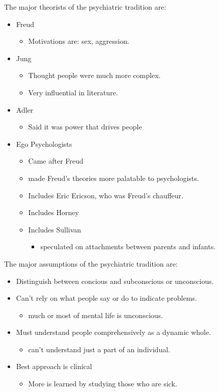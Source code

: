 \documentclass[12pt]{article}
\begin{document}
The major theorists of the psychiatric tradition are:
\begin{itemize}
    \item Freud
        \begin{itemize}
            \item Motivations are: sex, aggression.
        \end{itemize}
    \item Jung
        \begin{itemize}
            \item Thought people were much more complex.
            \item Very influential in literature.
        \end{itemize}
    \item Adler
        \begin{itemize}
            \item Said it was power that drives people
        \end{itemize}
    \item Ego Psychologists
        \begin{itemize}
            \item Came after Freud
            \item made Freud's theories more palatable to psychologists.
            \item Includes Eric Ericson, who was Freud's chauffeur.
            \item Includes Horney
            \item Includes Sullivan
                \begin{itemize}
                    \item speculated on attachments between parents and infants.
                \end{itemize}
        \end{itemize}
\end{itemize}

The major assumptions of the psychiatric tradition are:
\begin{itemize}
    \item Distinguish between concious and subconscious or unconscious.
    \item Can't rely on what people say or do to indicate problems.
        \begin{itemize}
            \item much or most of mental life is unconscious.
        \end{itemize}
    \item Must understand people comprehensively as a dynamic whole.
        \begin{itemize}
            \item can't understand just a part of an individual.
        \end{itemize}
    \item Best approach is clinical
        \begin{itemize}
            \item More is learned by studying those who are sick.
        \end{itemize}
\end{itemize}
\end{document}
